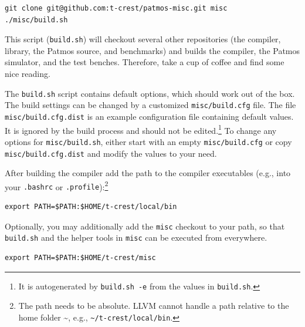\documentclass[a4paper,fontsize=10pt,twoside,DIV15,BCOR12mm,headinclude=true,footinclude=false,pagesize,bibtotoc]{scrbook}
\newcommand{\code}[1]{{\texttt{#1}}}
\newcommand{\comment}[3]{

\textsf{\textbf{#1}} {\color{#3}#2}}
\newcommand{\martin}[1]{\comment{Martin}{#1}{Blue}}
\newcommand{\stefan}[1]{\comment{Stefan}{#1}{RoyalPurple}}
\renewcommand{\martin}[1]{}
\renewcommand{\stefan}[1]{}
\begin{document}
\begin{verbatim}
git clone git@github.com:t-crest/patmos-misc.git misc
./misc/build.sh
\end{verbatim}

This script (\code{build.sh}) will checkout several other repositories (the compiler, library,
the Patmos source, and benchmarks) and
builds the compiler, the Patmos simulator, and the test benches.
Therefore, take a cup of coffee and find some nice reading.

The \code{build.sh} script contains default options, which should work out of the box. 
The build settings can be changed by a customized \code{misc/build.cfg} file. The file \code{misc/build.cfg.dist}
is an example configuration file containing default values. It is ignored by the build process and should not be
edited.\footnote{It is autogenerated by \code{build.sh -e} from the values in \code{build.sh}.}
To change any options for \code{misc/build.sh}, either start with an empty \code{misc/build.cfg} or
copy \code{misc/build.cfg.dist} and modify the values to your need.

After building the compiler add the path
to the compiler executables (e.g., into your \code{.bashrc} or
\code{.profile}):\footnote{The path needs to be absolute. LLVM cannot handle
a path relative to the home folder \textasciitilde{}, e.g., \code{\textasciitilde{}/t-crest/local/bin}.}

\martin{In Mac OS X I have only .profile and I don't understand what the issue by 'only read by login terminals'.}
\stefan{Login shells are only opened at logins. Interactive terminals are all terminals that are opened by your window manager or
other means. This is why you need to reboot to have .profile take effect. There are slight differences between bash and zsh when which file is read, 
and distribution further mix up the files in non-standard ways.}

\stefan{Relative paths should actually work, but the \textasciitilde{} shortcut is shell-specific and may not work, but
not sure about this.}

\begin{verbatim}
export PATH=$PATH:$HOME/t-crest/local/bin
\end{verbatim}

Optionally, you may additionally add the \code{misc} checkout to your path, so that \code{build.sh} and the helper tools in 
\code{misc} can be executed from everywhere.

\begin{verbatim}
export PATH=$PATH:$HOME/t-crest/misc
\end{verbatim}
\end{document}
